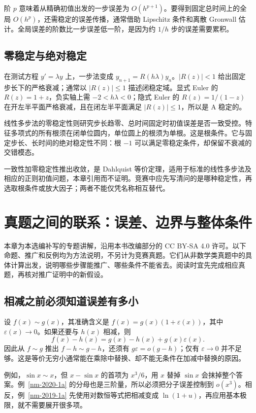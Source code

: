 \documentclass[12pt,fontset=fandol]{ctexart}
\begin{document}
阶 $p$ 意味着从精确初值出发的一步误差为 $O(h^{p+1})$。要得到固定总时间上的全局 $O(h^p)$，还需稳定的误差传播，通常借助 Lipschitz 条件和离散 Gronwall 估计。全局误差的阶数比一步误差低一阶，是因为约 $1/h$ 步的误差需要累积。

\subsection{零稳定与绝对稳定}

\label{app:dynamics-stability}

在测试方程 $y'=\lambda y$ 上，一步法变成 $y_{n+1}=R(h\lambda)y_n$。$|R(z)|<1$ 给出固定步长下的严格衰减；通常以 $|R(z)|\leq1$ 描述闭稳定域。显式 Euler 的 $R(z)=1+z$，负实轴上需 $-2<h\lambda<0$；隐式 Euler 的 $R(z)=1/(1-z)$ 在开左半平面严格衰减，且在闭左半平面满足 $|R(z)|\leq1$，所以是 A 稳定的。

线性多步法的零稳定性则研究步长趋零、总时间固定时初值误差是否一致受控。特征多项式的所有根须在闭单位圆内，单位圆上的根须为单根。这是根条件。它与固定步长、长时间的绝对稳定性不同：根 $-1$ 可以满足零稳定条件，却保留不衰减的交错模态。

一致性加零稳定性推出收敛，是 Dahlquist 等价定理，适用于标准的线性多步法及相应的正则初值问题，本章引用而不证明。竞赛中应先写清问的是哪种稳定性，再选取根条件或放大因子；两者不能仅凭名称相互替代。

\section{真题之间的联系：误差、边界与整体条件}\label{sec:supp-audit}
本章为本选编补写的专题讲解，沿用本书改编部分的 CC BY-SA 4.0 许可。以下命题、推广和反例均为方法说明，不另计为竞赛真题。它们从非数学类真题中的具体计算出发，说明哪些步骤能推广、哪些条件不能省去。阅读时宜先完成相应真题，再核对推广证明中的新假设。

\subsection{相减之前必须知道误差有多小}
设 $f(x)\sim g(x)$，其准确含义是 $f(x)=g(x)(1+\varepsilon(x))$，其中 $\varepsilon(x)\to0$。如果还要与 $h(x)$ 相减，则
\[
 f(x)-h(x)=g(x)-h(x)+g(x)\varepsilon(x).
\]
因此从 $f\sim g$ 推出 $f-h\sim g-h$，还须有 $g\varepsilon=o(g-h)$；仅有 $\varepsilon\to0$ 并不足够。这是等价无穷小通常能在乘除中替换、却不能无条件在加减中替换的原因。

例如，$\sin x\sim x$，但 $x-\sin x$ 的首项为 $x^3/6$，用 $x$ 替掉 $\sin x$ 会抹掉整个答案。例~\ref{nm-2020-1a} 的分母也是三阶量，所以必须把分子误差控制到 $o(x^3)$。相反，例~\ref{nm-2019-1a} 先使用对数恒等式把相减变成 $\ln(1+u)$，再应用基本极限，就不需要展开很多项。
\end{document}
